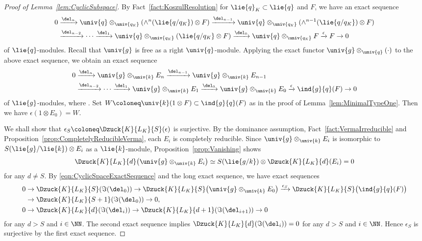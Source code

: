 \begin{proof}[Proof of Lemma~\ref{lem:CyclicSubspace}]
	By Fact~\ref{fact:KoszulResolution} for $\lie{q}_K\subset \lie{q}$ and $F$, we have an exact sequence
	\begin{align*}
0&\xrightarrow{\del_n} \univ{q}\otimes_{\univ{q_\mathit{K}}}(\wedge^n (\lie{q/q_\mathit{K}})\otimes F)
		\xrightarrow{\del_{n-1}} \univ{q}\otimes_{\univ{q_\mathit{K}}}(\wedge^{n-1} (\lie{q/q_\mathit{K}})\otimes F)\\
		& \xrightarrow{\del_{n-2}} \cdots \xrightarrow{\del_{1}} \univ{q}\otimes_{\univ{q_\mathit{K}}}(\lie{q/q_\mathit{K}}\otimes F)
		\xrightarrow{\del_{0}} \univ{q}\otimes_{\univ{q_\mathit{K}}}F
		\xrightarrow{\epsilon} F \rightarrow 0
	\end{align*}
	of $\lie{q}$-modules.
	Recall that $\univ{g}$ is free as a right $\univ{q}$-module.
	Applying the exact functor $\univ{g}\otimes_{\univ{q}}(\cdot)$
	to the above exact sequence, we obtain an exact sequence
	\begin{align}
0&\xrightarrow{\del_n} \univ{g}\otimes_{\univ{k}}E_n
		\xrightarrow{\del_{n-1}} \univ{g}\otimes_{\univ{k}}E_{n-1} \nonumber\\
		& \xrightarrow{\del_{n-2}} \cdots \xrightarrow{\del_{1}} \univ{g}\otimes_{\univ{k}}E_1
		\xrightarrow{\del_{0}} \univ{g}\otimes_{\univ{k}}E_0
		\xrightarrow{\epsilon} \ind{g}{q}(F) \rightarrow 0 \label{eqn:CyclicSpaceExactSequence}
	\end{align}
	of $\lie{g}$-modules, where .
	Set $W \coloneq \univ{k}(1\otimes F) \subset \ind{g}{q}(F)$ as in the proof of Lemma~\ref{lem:MinimalTypeOne}.
	Then we have $\epsilon(1\otimes E_0)=W$.

	We shall show that $\epsilon_S\coloneq \Dzuck{K}{L_K}{S}(\epsilon)$ is surjective.
	By the dominance assumption, Fact~\ref{fact:VermaIrreducible} and Proposition~\ref{prop:CompletelyReducibleVerma}, each $E_i$ is completely reducible.
	Since $\univ{g}\otimes_{\univ{k}}E_i$
	is isomorphic to $S(\lie{g}/\lie{k})\otimes E_i$ as a $\lie{k}$-module, Proposition~\ref{prop:Vanishing} shows
	\begin{align*}
		\Dzuck{K}{L_K}{d}\bigl(\univ{g}\otimes_{\univ{k}}E_i\bigr)
		\simeq S(\lie{g/k})\otimes \Dzuck{K}{L_K}{d}(E_i) = 0
	\end{align*}
	for any $d \neq S$.
	By \eqref{eqn:CyclicSpaceExactSequence} and the long exact sequence, we have exact sequences
	\begin{align*}
		&0 \rightarrow \Dzuck{K}{L_K}{S}(\Im(\del_0))\rightarrow \Dzuck{K}{L_K}{S}\bigl(\univ{g}\otimes_{\univ{k}}E_0\bigr)
		\xrightarrow{\epsilon_S} \Dzuck{K}{L_K}{S}\bigl(\ind{g}{q}(F)\bigr)\\
		& \hphantom{0} \rightarrow \Dzuck{K}{L_K}{S+1}(\Im(\del_0)) \rightarrow 0, \\
		&0 \rightarrow \Dzuck{K}{L_K}{d}(\Im(\del_{i})) \rightarrow \Dzuck{K}{L_K}{d+1}(\Im(\del_{i+1})) \rightarrow 0
	\end{align*}
	for any $d > S$ and $i \in \NN$.
	The second exact sequence implies $\Dzuck{K}{L_K}{d}(\Im(\del_{i}))=0$ for any $d > S$ and $i \in \NN$.
	Hence $\epsilon_S$ is surjective by the first exact sequence.


\end{proof}

